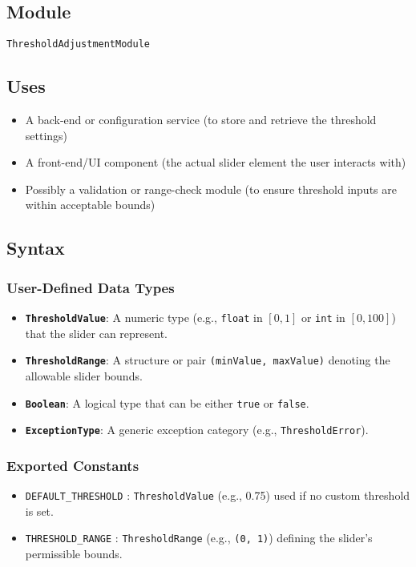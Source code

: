 \documentclass[12pt, titlepage]{article}
\begin{document}
\subsection{Module}

\texttt{ThresholdAdjustmentModule}

\subsection{Uses}

\begin{itemize}
    \item A back-end or configuration service (to store and retrieve the threshold settings)
    \item A front-end/UI component (the actual slider element the user interacts with)
    \item Possibly a validation or range-check module (to ensure threshold inputs are within acceptable bounds)
\end{itemize}

\subsection{Syntax}

\subsubsection{User-Defined Data Types}

\begin{itemize}
    \item \textbf{\texttt{ThresholdValue}}: A numeric type (e.g., \texttt{float} in $[0,1]$ or \texttt{int} in $[0,100]$) that the slider can represent.
    \item \textbf{\texttt{ThresholdRange}}: A structure or pair \texttt{(minValue, maxValue)} denoting the allowable slider bounds.
    \item \textbf{\texttt{Boolean}}: A logical type that can be either \texttt{true} or \texttt{false}.
    \item \textbf{\texttt{ExceptionType}}: A generic exception category (e.g., \texttt{ThresholdError}).
\end{itemize}

\subsubsection{Exported Constants}

\begin{itemize}
    \item \texttt{DEFAULT\_THRESHOLD} : \texttt{ThresholdValue} (e.g., 0.75) used if no custom threshold is set.
    \item \texttt{THRESHOLD\_RANGE} : \texttt{ThresholdRange} (e.g., \texttt{(0, 1)}) defining the slider’s permissible bounds.
\end{itemize}
\end{document}
